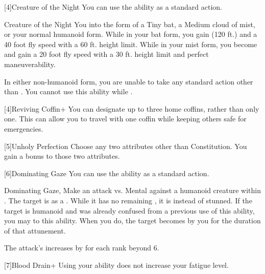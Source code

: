             [4]{Creature of the Night} You can use the  ability as a standard action.
            \begin{magicalattuneability}{Creature of the Night}{}
                \rankline
                You  into the form of a Tiny bat, a Medium cloud of mist, or your normal humanoid form.
                While in your bat form, you gain  (120 ft.) and a 40 foot fly speed with a 60 ft. height limit.
                While in your mist form, you become  and gain a 20 foot fly speed with a 30 ft. height limit and perfect maneuverability.

                In either non-humanoid form, you are unable to take any standard action other than .
                You cannot use this ability while \paralyzed.
            \end{magicalattuneability}

            [4]{Reviving Coffin+} You can designate up to three home coffins, rather than only one.
            This can allow you to travel with one coffin while keeping others safe for emergencies.

            [5]{Unholy Perfection} Choose any two attributes other than Constitution.
            You gain a  bonus to those two attributes.

            [6]{Dominating Gaze} You can use the  ability as a standard action.
            \begin{magicalactiveability}{Dominating Gaze}{, }
                \rankline
                Make an attack vs. Mental against a humanoid creature within \shortrange.
                \hit The target is \stunned as a .
                While it has no remaining , it is \confused instead of stunned.
                \crit If the target is humanoid and was already confused from a previous use of this ability, you may  to this ability.
                When you do, the target becomes \dominated by you for the duration of that attunement.

                \rankline
                The attack's  increases by  for each rank beyond 6.
            \end{magicalactiveability}

            [7]{Blood Drain+} Using your  ability does not increase your fatigue level.

